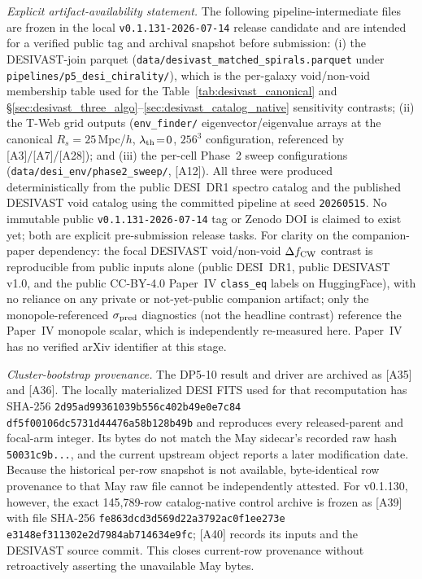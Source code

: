 \documentclass[aps,prd,twocolumn,superscriptaddress,showpacs,preprintnumbers,nofootinbib,longbibliography,floatfix]{revtex4-2}
\newcommand{\paperVersion}{v0.1.131-2026-07-14}
\begin{document}
\emph{Explicit artifact-availability statement.}
The following pipeline-intermediate files are frozen in the local
\texttt{\paperVersion} release candidate and are intended for a verified
public tag and archival snapshot before submission:
(i) the DESIVAST-join parquet
(\texttt{data/desivast\_matched\_spirals.parquet} under
\texttt{pipelines/p5\_desi\_chirality/}),
which is the per-galaxy void/non-void membership table used for the
Table~\ref{tab:desivast_canonical} and
\S\ref{sec:desivast_three_algo}--\ref{sec:desivast_catalog_native}
sensitivity contrasts;
(ii) the T-Web grid outputs
(\texttt{env\_finder/} eigenvector/eigenvalue arrays at the
canonical $R_s\!=\!25$\,Mpc/$h$, $\lambda_{\rm th}\!=\!0$, $256^3$
configuration, referenced by [A3]/[A7]/[A28]);
and (iii) the per-cell Phase~2 sweep configurations
(\texttt{data/desi\_env/phase2\_sweep/}, [A12]).
All three were produced deterministically from the public DESI~DR1
spectro catalog and the published DESIVAST void catalog using the
committed pipeline at seed \texttt{20260515}.
No immutable public \texttt{\paperVersion} tag or Zenodo DOI is claimed to
exist yet; both are explicit pre-submission release tasks. For clarity on the
companion-paper dependency: the focal DESIVAST void/non-void
$\Delta f_{\rm CW}$ contrast is reproducible from public inputs alone
(public DESI~DR1, public DESIVAST v1.0, and the public CC-BY-4.0 Paper~IV
\texttt{class\_eq} labels on HuggingFace), with no reliance on any private
or not-yet-public companion artifact; only the monopole-referenced
$\sigma_{\rm pred}$ diagnostics (not the headline contrast) reference the
Paper~IV monopole scalar, which is independently re-measured here.
Paper~IV has no verified arXiv identifier at this stage.

\emph{Cluster-bootstrap provenance.} The DP5-10 result and driver are
archived as [A35] and [A36]. The locally materialized DESI FITS used for
that recomputation has SHA-256
\texttt{2d95ad99361039b5}\allowbreak\texttt{56c402b49e0e7c84}\allowbreak
\texttt{df5f00106dc5731d}\allowbreak\texttt{44476a58b128b49b}
and reproduces every released-parent and focal-arm integer. Its bytes
do not match the May sidecar's recorded raw hash
\texttt{50031c9b...}, and the current upstream object reports a later
modification date. Because the historical per-row snapshot is not
available, byte-identical row provenance to that May raw file cannot be
independently attested. For v0.1.130, however, the exact 145,789-row
catalog-native control archive is frozen as [A39] with file SHA-256
\texttt{fe863dcd3d569d22a3792ac0f1ee273e}
\texttt{e3148ef311302e2d7984ab714634e9fc}; [A40] records its inputs and the
DESIVAST source commit. This closes current-row provenance without
retroactively asserting the unavailable May bytes.
\end{document}
